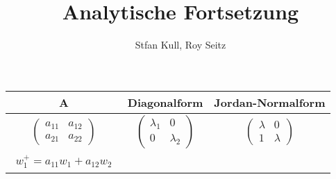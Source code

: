 \documentclass[]{article}
\author{Stfan Kull, Roy Seitz}
\title{Analytische Fortsetzung}
\begin{document}
	
\maketitle{}


\begin{tabular}{|c| c |c|}
	\hline
	A & Diagonalform & Jordan-Normalform\\
	\hline
	$\begin{pmatrix}
		a_{11} & a_{12} \\ a_{21} & a_{22}
	\end{pmatrix}$ & 
	$\begin{pmatrix}
		\lambda_1 & 0 \\ 0 & \lambda_2
	\end{pmatrix}$ & 
		$\begin{pmatrix}
			\lambda & 0 \\ 1 & \lambda
		\end{pmatrix}$ \\
	\hline
	\[\begin{split}
		w_1^+ =a_{11}w_1 + a_{12}w_2 
	\end{split}\]
\end{tabular}
\end{document}
